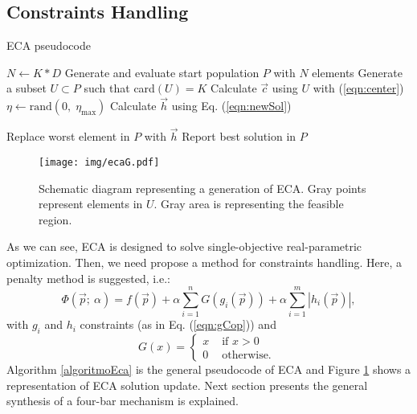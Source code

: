 \documentclass[12pt,letterpape]{article}
\begin{document}

\subsection{Constraints Handling} %
\label{sub:constraints_handling}

\begin{algorithm}[!ht]
	\caption{ECA pseudocode}
	\label{algoritmoEca}
	\begin{algorithmic}[1]
		\State $N \gets K * D$
		\State Generate and evaluate start population $P$ with $N$ elements
				\State Generate a subset $U \subset P$ such that  card$(U) = K$
				\State Calculate $\vec{c}$ using $U$ with (\ref{eqn:center})
				\State $\eta \gets \text{rand}(0,\; \eta_{\max}) $ 
				\State Calculate $\vec{h}$ using Eq. (\ref{eqn:newSol})
				
					\State Replace worst element in $P$ with $\vec{h}$
				\EndIf
			\EndFor
		\EndWhile
		\State Report best solution in $P$
		\EndProcedure
	\end{algorithmic}
\end{algorithm}


\begin{figure}[!ht]
	\centering
	\texttt{[image: img/ecaG.pdf]}
	\caption{Schematic diagram representing a generation of ECA. Gray points %
	represent elements in $U$. Gray area is representing the feasible region.}
	\label{fig:ecag}       %
\end{figure}

As we can see, ECA is designed to solve single-objective real-parametric optimization.
Then, we need propose a method for constraints handling. Here, a penalty
method is suggested, i.e.:
% 
\begin{equation}
	\Phi( \vec{p} ;\ \alpha ) = f( \vec{p} ) + \alpha \sum_{i=1}^{n} G(g_i( \vec{p} ) )
	 + \alpha \sum_{i=1}^{m} |h_i( \vec{p} )|,
% 
	\label{eqn:phiObj}
% 
\end{equation}
with $g_i$ and $h_i$ constraints (as in Eq. (\ref{eqn:gCop})) and 
$$
G(x) = 
\begin{cases}
	\displaystyle
	x & \text{ if } x > 0 \\
	0 & \text{ otherwise. }
\end{cases}
$$
% 
% 
% 
Algorithm \ref{algoritmoEca} is the general pseudocode of ECA and Figure \ref{fig:ecag}
shows a representation of ECA solution update. 
% 
Next section presents the general
synthesis of a four-bar mechanism is explained.
% 
% 
\end{document}
